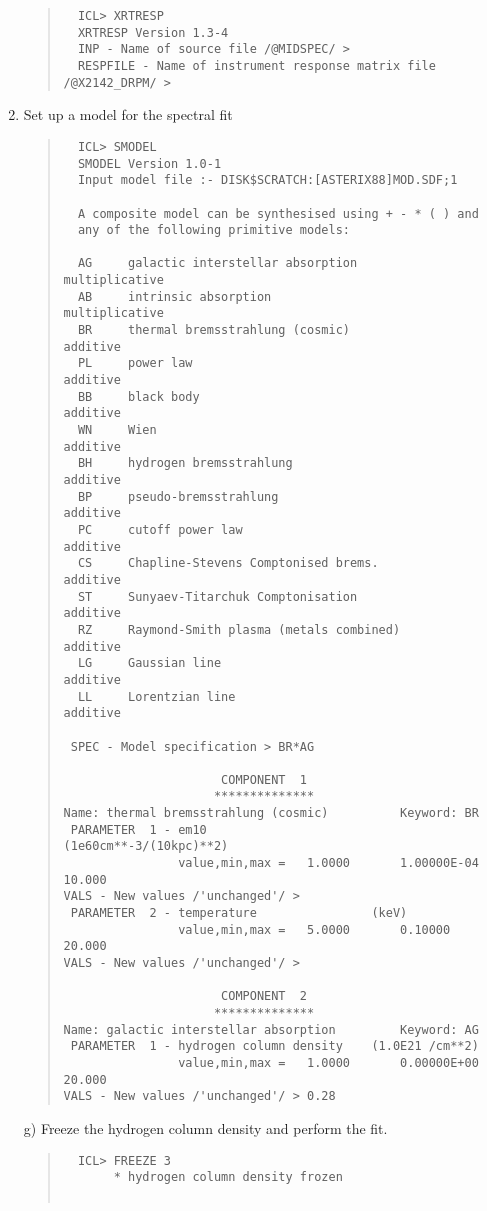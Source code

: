 \documentclass{book}
\renewcommand{\_}{{\tt\char'137}}     %
\begin{document}
\begin{enumerate}
\begin{quote}\begin{verbatim}
  ICL> XRTRESP
  XRTRESP Version 1.3-4
  INP - Name of source file /@MIDSPEC/ >
  RESPFILE - Name of instrument response matrix file /@X2142_DRPM/ >
  \end{verbatim}\end{quote}
\item Set up a model for the spectral fit
 
\begin{quote}\begin{verbatim}
  ICL> SMODEL
  SMODEL Version 1.0-1
  Input model file :- DISK$SCRATCH:[ASTERIX88]MOD.SDF;1
 
  A composite model can be synthesised using + - * ( ) and
  any of the following primitive models:
 
  AG     galactic interstellar absorption             multiplicative
  AB     intrinsic absorption                         multiplicative
  BR     thermal bremsstrahlung (cosmic)              additive
  PL     power law                                    additive
  BB     black body                                   additive
  WN     Wien                                         additive
  BH     hydrogen bremsstrahlung                      additive
  BP     pseudo-bremsstrahlung                        additive
  PC     cutoff power law                             additive
  CS     Chapline-Stevens Comptonised brems.          additive
  ST     Sunyaev-Titarchuk Comptonisation             additive
  RZ     Raymond-Smith plasma (metals combined)       additive
  LG     Gaussian line                                additive
  LL     Lorentzian line                              additive
 
 SPEC - Model specification > BR*AG
 
                      COMPONENT  1
                     **************
Name: thermal bremsstrahlung (cosmic)          Keyword: BR
 PARAMETER  1 - em10                       (1e60cm**-3/(10kpc)**2)
                value,min,max =   1.0000       1.00000E-04    10.000
VALS - New values /'unchanged'/ >
 PARAMETER  2 - temperature                (keV)
                value,min,max =   5.0000       0.10000        20.000
VALS - New values /'unchanged'/ >
 
                      COMPONENT  2
                     **************
Name: galactic interstellar absorption         Keyword: AG
 PARAMETER  1 - hydrogen column density    (1.0E21 /cm**2)
                value,min,max =   1.0000       0.00000E+00    20.000
VALS - New values /'unchanged'/ > 0.28
  \end{verbatim}\end{quote}
g) Freeze the hydrogen column density and perform the fit.
\begin{quote}\begin{verbatim}
  ICL> FREEZE 3
       * hydrogen column density frozen
 

\end{verbatim}
\end{quote}
\end{enumerate}
\end{document}
